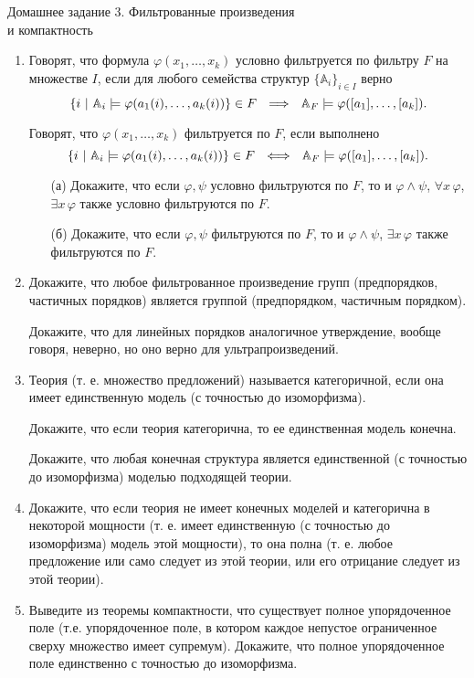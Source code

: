 \documentclass[a4paper,11pt]{article}
\begin{document}
\begin{center}
	\Large Домашнее задание 3. Фильтрованные произведения \\ и компактность
\end{center}

\begin{enumerate}
	\item Говорят, что формула $\varphi(x_1,\ldots,x_k)$ условно фильтруется по фильтру $F$ на множестве $I$, если для любого семейства структур $\{\mathbb{A}_i\}_{i\in I}$ верно
	\[ \set*{i\ \middle\vert\ \mathbb{A}_i\models \varphi\lr*{a_1(i),\ldots,a_k(i)}}\in F\ \ \Lra\ \ 
	    \mathbb{A}_F\models\varphi\lr*{\segment*{a_1},\ldots,\segment*{a_k}}.\]

Говорят, что  $\varphi(x_1,\ldots,x_k)$  фильтруется по $F$, если выполнено
	\[ \set*{i\ \middle\vert\ \mathbb{A}_i\models \varphi\lr*{a_1(i),\ldots,a_k(i)}}\in F
	    \ \ \Longleftrightarrow\ \ 
	    \mathbb{A}_F\models\varphi\lr*{\segment*{a_1},\ldots,\segment*{a_k}}.\]

    \begin{enumerate}
        \item[(а)] Докажите, что если $\varphi,\psi$ условно фильтруются по $F$, то и $\varphi\land\psi$, $\forall x\,\varphi$, $\exists x\,\varphi$ также условно фильтруются по $F$. 

        \item[(б)] Докажите, что если $\varphi,\psi$  фильтруются по $F$, то и $\varphi\land\psi$, $\exists x\,\varphi$ также  фильтруются по $F$.
    \end{enumerate}


	\item Докажите, что любое фильтрованное произведение групп (предпорядков, частичных порядков) является группой (предпорядком, частичным порядком). 

Докажите, что для линейных порядков аналогичное утверждение, вообще говоря, неверно, но оно верно для ультрапроизведений.


	\item Теория (т. е. множество предложений) называется категоричной, если она имеет единственную модель (с точностью до изоморфизма). 

Докажите, что если теория категорична, то ее единственная модель конечна. 

Докажите, что любая конечная структура является единственной (с точностью до изоморфизма) моделью подходящей теории.


	\item Докажите, что если теория не имеет конечных моделей и категорична в некоторой мощности (т. е.  имеет единственную (с точностью до изоморфизма) модель этой мощности), то она полна (т. е. любое предложение или само следует из этой теории, или его отрицание следует из этой теории).


	\item Выведите из теоремы компактности, что существует полное упорядоченное поле (т.е. упорядоченное поле, в котором каждое непустое ограниченное сверху множество имеет супремум). Докажите, что полное упорядоченное поле единственно с точностью до изоморфизма.

\end{enumerate}
\end{document}
